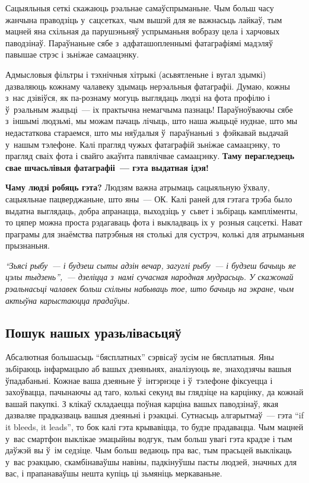 Сацыяльныя сеткі скажаюць рэальнае самаўспрыманьне. Чым больш часу жанчына праводзіць у~сацсетках, чым вышэй для яе важнасьць лайкаў, тым мацней яна схільная да парушэньняў успрыманьня вобразу цела і харчовых паводзінаў. Параўнаньне сябе з~адфаташопленнымі фатаграфіямі мадэляў павышае стрэс і зьніжае самаацэнку.

Адмысловыя фільтры і тэхнічныя хітрыкі (асьвятленьне і вугал здымкі) дазваляюць кожнаму чалавеку здымаць нерэальныя фатаграфіі. Думаю, кожны з~нас дзівіўся, як па-рознаму могуць выглядаць людзі на фота профілю і ў~рэальным жыцьці~--- іх практычна немагчыма пазнаць! Параўноўваючы сябе з~іншымі людзьмі, мы можам пачаць лічыць, што наша жыцьцё нуднае, што мы недастаткова стараемся, што мы няўдалыя ў~параўнаньні з~фэйкавай выдачай у~нашым тэлефоне. Калі прагляд чужых фатаграфій зьніжае самаацэнку, то прагляд сваіх фота і свайго акаўнта павялічвае самаацэнку. \textbf{Таму перагледзець свае шчасьлівыя фатаграфіі~--- гэта выдатная ідэя!}

\textbf{Чаму людзі робяць гэта?} Людзям важна атрымаць сацыяльную ўхвалу, сацыяльнае пацверджаньне, што яны~--- ОК. Калі раней для гэтага трэба было выдатна выглядаць, добра апранацца, выходзіць у~сьвет і зьбіраць кампліменты, то цяпер можна проста рэдагаваць фота і выкладваць іх у~розныя сацсеткі. Нават праграмы для знаёмства патрэбныя ня столькі для сустрэч, колькі для атрыманьня прызнаньня.

\emph{``Зьясі рыбу~--- і будзеш сыты адзін вечар, загуглі рыбу~--- і будзеш бачыць яе цэлы тыдзень'',~--- дзеліцца з~намі сучасная народная мудрасьць. У скажонай рэальнасьці чалавек больш схільны набываць тое, што бачыць на экране, чым актыўна карыстаюцца прадаўцы.}

\subsection*{Пошук нашых уразьлівасьцяў}

Абсалютная большасьць ``бясплатных'' сэрвісаў зусім не бясплатныя. Яны зьбіраюць інфармацыю аб вашых дзеяньнях, аналізуюць яе, знаходзячы вашыя ўпадабаньні. Кожнае ваша дзеяньне ў~інтэрнэце і ў~тэлефоне фіксуецца і захоўвацца, пачынаючы ад таго, колькі секунд вы глядзіце на карцінку, да кожнай вашай пакупкі. З клікаў складаецца поўная карціна вашых паводзінаў, якая дазваляе прадказваць вашыя дзеяньні і рэакцыі. Сутнасьць алгарытмаў~--- гэта ``if it bleeds, it leads'', то бок калі гэта крывавіцца, то будзе прадавацца. Чым мацней у~вас смартфон выклікае эмацыйны водгук, тым больш увагі гэта крадзе і тым даўжэй вы ў~ім седзіце. Чым больш ведаюць пра вас, тым прасьцей выклікаць у~вас рэакцыю, скамбінаваўшы навіны, падкінуўшы пасты людзей, значных для вас, і прапанаваўшы нешта купіць ці зьмяніць меркаваньне.

